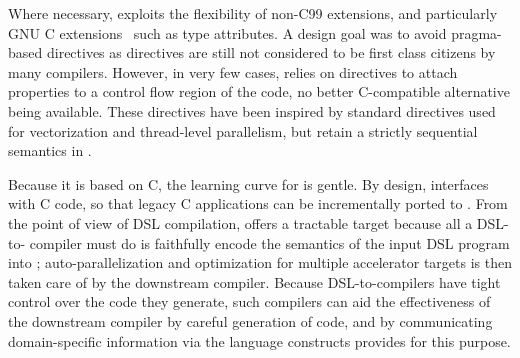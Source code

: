 Where necessary, \pencil exploits the flexibility of non-C99 extensions,
and particularly GNU
C extensions~\cite{gccguide} such as type attributes.
A design goal was to avoid pragma-based directives as directives are still
not considered to be first class citizens by many compilers.
However, in very few cases, \pencil relies on directives to attach
properties to a control flow region of the code, no better C-compatible
alternative being available.
These directives have been inspired by standard directives used
for vectorization and thread-level parallelism, but retain a strictly
sequential semantics in \pencil.

Because it is based on C, the learning curve for \pencil is gentle.
By design, \pencil interfaces with C code, so that legacy C 
applications can be
incrementally ported to \pencil.  From the point of view of DSL
compilation, \pencil offers a tractable target because all a DSL-to-\pencil
compiler must do is faithfully encode the semantics of the input DSL program
into \pencil; auto-parallelization and optimization for multiple accelerator
targets is then taken care of by the downstream \pencil compiler.
Because DSL-to-\pencil compilers have tight control over the code they
generate, such compilers can aid the effectiveness of the downstream
\pencil compiler by careful generation of code, and by communicating
domain-specific information via the language constructs \pencil provides
for this purpose.


